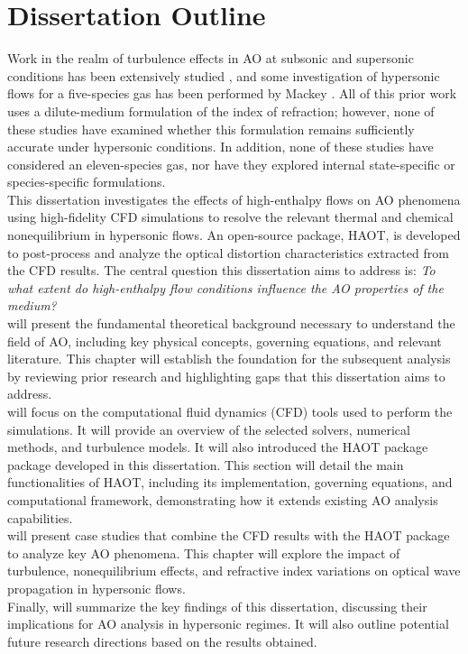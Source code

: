 \section{Dissertation Outline\label{ch1:dissertationOutline}}
Work in the realm of turbulence effects in \gls{AO} at subsonic and supersonic
conditions has been extensively studied \cite{Mathews2019,Wang2007}, and some
investigation of hypersonic flows for a five-species gas has been performed by
Mackey \cite{Mackey2018,Mackey2019,Mackey2019a}. All of this prior work uses a
dilute-medium formulation of the index of refraction; however, none of these studies
have examined whether this formulation remains sufficiently accurate under
hypersonic conditions. In addition, none of these studies have considered an
eleven-species gas, nor have they explored internal state-specific or
species-specific formulations.\\

This dissertation investigates the effects of high-enthalpy flows on \gls{AO}
phenomena using high-fidelity \gls{CFD} simulations to resolve the relevant
thermal and chemical nonequilibrium in hypersonic flows. An open-source package,
\gls{HAOT}, is developed to post-process and analyze the optical distortion
characteristics extracted from the \gls{CFD} results. The central question this
dissertation aims to address is: \textit{To what extent do high-enthalpy flow
conditions influence the \gls{AO} properties of the medium?} \\

 will present the fundamental theoretical background
necessary to understand the field of \gls{AO}, including key physical
concepts, governing equations, and relevant literature. This chapter will
establish the foundation for the subsequent analysis by reviewing prior
research and highlighting gaps that this dissertation aims to address. \\

 will focus on the computational fluid dynamics
(\gls{CFD}) tools used to perform the simulations. It will provide an overview
of the selected solvers, numerical methods, and turbulence models. It will also
introduced the \gls{HAOT} package package developed in this dissertation. This
section will detail the main functionalities of \gls{HAOT}, including its implementation, governing
equations, and computational framework, demonstrating how it extends existing
\gls{AO} analysis capabilities. \\

 will present case studies that combine the \gls{CFD}
results with the \gls{HAOT} package to analyze key \gls{AO} phenomena. This
chapter will explore the impact of turbulence, nonequilibrium effects, and
refractive index variations on optical wave propagation in hypersonic flows. \\

Finally,  will summarize the key findings of this
dissertation, discussing their implications for \gls{AO} analysis in
hypersonic regimes. It will also outline potential future research directions
based on the results obtained. \\
